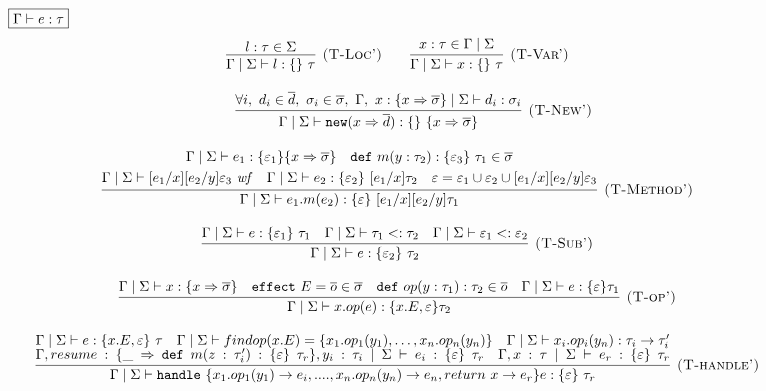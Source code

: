 \documentclass{article}
\newcommand{\keywadj}[1]{\mathtt{#1}}
\newcommand{\keyw}[1]{\keywadj{#1}~}
\begin{document}
\begin{figure}[H]
\footnotesize{
\noindent$\fbox{$\Gamma \vdash e : \tau$}$
\[
\begin{array}{c}

\infer[\textsc{(T-Loc')}]
  {\Gamma \mid \Sigma \vdash l : \{ \}~\tau}
  {l:\tau \in \Sigma } \quad \quad 
  
\infer[\textsc{(T-Var')}]
  {\Gamma \mid \Sigma \vdash x : \{ \}~\tau}
  {x : \tau \in \Gamma \mid \Sigma} \\[3ex]
~~~~~~~
\infer[\textsc{(T-New')}]
	{\Gamma \mid \Sigma \vdash \keywadj{new} (x \Rightarrow \overline{d}) : \{ \}~\{ x \Rightarrow \overline{\sigma} \}}
	{\forall i,~d_i \in \overline{d},~\sigma_i \in \overline{\sigma},~\Gamma,~x : \{ x \Rightarrow \overline{\sigma} \} \mid \Sigma \vdash d_i : \sigma_i}\\[3ex]
\infer[\textsc{(T-Method')}]
  {\Gamma \mid \Sigma \vdash e_1.m(e_2) : \{ \varepsilon \}~[e_1/x][e_2/y]\tau_1}
  {\begin{gathered} \Gamma \mid \Sigma \vdash e_1 : \{ \varepsilon_1 \} \{ x \Rightarrow \overline{\sigma} \}\quad \keyw{def} m(y : \tau_2) : \{ \varepsilon_3 \}~\tau_1 \in \overline{\sigma}\\
  \Gamma \mid \Sigma \vdash [e_1/x][e_2/y]\varepsilon_3~\mathit{wf}\quad \Gamma \mid \Sigma \vdash e_2 : \{ \varepsilon_2 \}~[e_1/x]\tau_2 \quad \varepsilon = \varepsilon_1 \cup \varepsilon_2 \cup [e_1/x][e_2/y]\varepsilon_3 \end{gathered}}\\[3ex]

\infer[\textsc{(T-Sub')}]
  {\Gamma \mid \Sigma \vdash e : \{ \varepsilon_2 \}~\tau_2}
  {\Gamma \mid \Sigma \vdash e : \{ \varepsilon_1 \}~\tau_1 & \Gamma \mid \Sigma \vdash \tau_1 <: \tau_2 & \Gamma \mid \Sigma \vdash \varepsilon_1 <: \varepsilon_2} \\[3ex]

\infer[\textsc{(T-op')}]
  {\Gamma \mid \Sigma \vdash x.op(e): \{x.E, \varepsilon\} \tau _2}
  {\Gamma \mid \Sigma \vdash x:  \{x \Rightarrow \overline{\sigma}\} \quad
   \keyw{effect} E = \overline{o} \in \overline{\sigma} \quad 
   \keyw{def} op(y: \tau_1): \tau_2 \in \overline{o} \quad 
   \Gamma \mid \Sigma \vdash e: \{\varepsilon \} \tau_1
  }
  \\[3ex]
  
  \infer[\textsc{(T-handle')}]
  {\Gamma \mid \Sigma \vdash \keyw{handle} \{x_1.op_1(y_1)\rightarrow e_i, ...., x_n.op_n(y_n)\rightarrow e_n, return\ x\rightarrow e_r\} e: \{\varepsilon\}\ \tau_r }
  {\Gamma \mid \Sigma \vdash e: \{x.E, \varepsilon\}\ \tau \quad 
  \Gamma \mid \Sigma \vdash findop(x.E) = \{ x_1.op_1(y_1), \dots, x_n.op_n(y_n)\} \quad
   \Gamma \mid \Sigma \vdash x_i.op_i(y_n) : \tau_i \rightarrow \tau_i'\\  
   \Gamma, resume: \{\_ \Rightarrow \keyw{def} m(z: \tau_i') : \{\varepsilon\}\ \tau_r\} , y_i:\tau_i \mid \Sigma \vdash e_i: \{\varepsilon\}\ \tau_r \quad \Gamma, x:\tau \mid \Sigma \vdash e_r: \{\varepsilon\}\ \tau_r
  }\\[3ex]
  

\end{array}\]}
\end{figure}
\end{document}
